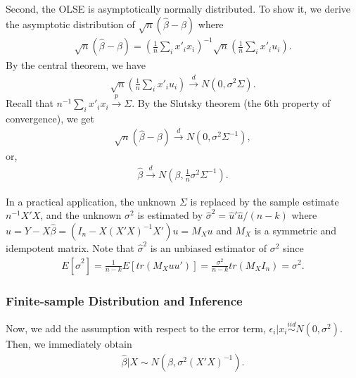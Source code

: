 \documentclass[
  12pt,
]{article}
\begin{document}
Second, the OLSE is asymptotically normally distributed.
To show it, we derive the asymptotic distribution of \(\sqrt{n}(\hat{\beta} - \beta)\) where
\begin{align*}
  \sqrt{n}(\hat{\beta} - \beta) = \left( \frac{1}{n} \sum_i x'_i x_i \right)^{-1} \sqrt{n} \left( \frac{1}{n} \sum_i x'_i u_i \right).
\end{align*}
By the central theorem, we have
\begin{align*}
  \sqrt{n} \left( \frac{1}{n} \sum_i x'_i u_i \right) \overset{d}{\to} N(0, \sigma^2 \Sigma).
\end{align*}
Recall that \(n^{-1} \sum_i x'_i x_i \overset{p}{\to} \Sigma\).
By the Slutsky theorem (the 6th property of convergence), we get
\begin{align*}
  \sqrt{n}(\hat{\beta} - \beta) \overset{d}{\to} N(0, \sigma^2 \Sigma^{-1}),
\end{align*}
or,
\begin{align*}
  \hat{\beta} \overset{d}{\to} N \left(\beta, \frac{1}{n} \sigma^2 \Sigma^{-1} \right).
\end{align*}

In a practical application, the unknown \(\Sigma\) is replaced by the sample estimate \(n^{-1} X'X\),
and the unknown \(\sigma^2\) is estimated by \(\hat{\sigma}^2 = \hat{u}'\hat{u}/(n-k)\)
where \(\hat{u} = Y - X \hat{\beta} = (I_n - X(X'X)^{-1}X')u = M_X u\) and \(M_X\) is a symmetric and idempotent matrix.
Note that \(\hat{\sigma}^2\) is an unbiased estimator of \(\sigma^2\) since
\begin{align*}
  E[ \hat{\sigma}^2 ] = \frac{1}{n-k} E[tr(M_X uu')] = \frac{\sigma^2}{n-k} tr(M_X I_n) = \sigma^2. 
\end{align*}

\hypertarget{finite-sample-distribution-and-inference}{%
\subsubsection{Finite-sample Distribution and Inference}\label{finite-sample-distribution-and-inference}}

Now, we add the assumption with respect to the error term, \(\epsilon_i |x_i \overset{iid}{\sim} N(0, \sigma^2)\).
Then, we immediately obtain
\begin{align*}
  \hat{\beta}|X \sim N(\beta, \sigma^2(X'X)^{-1}).
\end{align*}
\end{document}
